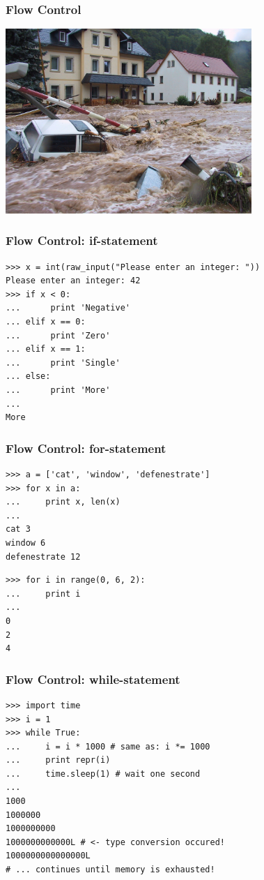 \documentclass[t,10pt,compress=false,usepdftitle=false]{beamer}
\begin{document}
\begin{frame}[fragile]
    \frametitle{Flow Control}
    \begin{center}
      \includegraphics[width=0.7\textwidth]{flowcontrol.jpg}
    \end{center}
\end{frame}


\begin{frame}[fragile]
    \frametitle{Flow Control: if-statement}
    \begin{myColorBox}{0.9}{}
\begin{verbatim}
>>> x = int(raw_input("Please enter an integer: "))
Please enter an integer: 42
>>> if x < 0:
...      print 'Negative'
... elif x == 0:
...      print 'Zero'
... elif x == 1:
...      print 'Single'
... else:
...      print 'More'
...
More
\end{verbatim}
    \end{myColorBox}
\end{frame}


\begin{frame}[fragile]
    \frametitle{Flow Control: for-statement}
    \begin{myColorBox}{0.9}{}
\begin{verbatim}
>>> a = ['cat', 'window', 'defenestrate']
>>> for x in a:
...     print x, len(x)
...
cat 3
window 6
defenestrate 12
\end{verbatim}
    \end{myColorBox}
    \pause
    \begin{myColorBox}{0.9}{}
\begin{verbatim}
>>> for i in range(0, 6, 2):
...     print i
...
0
2
4
\end{verbatim}
    \end{myColorBox}
\end{frame}


\begin{frame}[fragile]
    \frametitle{Flow Control: while-statement}
    \begin{myColorBox}{0.9}{}
\begin{verbatim}
>>> import time
>>> i = 1
>>> while True:
...     i = i * 1000 # same as: i *= 1000
...     print repr(i)
...     time.sleep(1) # wait one second
...
1000
1000000
1000000000
1000000000000L # <- type conversion occured!
1000000000000000L
# ... continues until memory is exhausted!
\end{verbatim}
    \end{myColorBox}
\end{frame}
\end{document}
